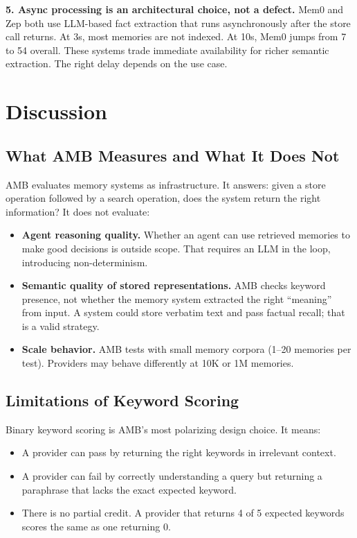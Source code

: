 \documentclass[11pt]{article}
\begin{document}
\textbf{5. Async processing is an architectural choice, not a defect.} Mem0 and Zep both use LLM-based fact extraction that runs asynchronously after the store call returns. At 3s, most memories are not indexed. At 10s, Mem0 jumps from 7 to 54 overall. These systems trade immediate availability for richer semantic extraction. The right delay depends on the use case.

\section{Discussion}

\subsection{What AMB Measures and What It Does Not}

AMB evaluates memory systems as infrastructure. It answers: given a store operation followed by a search operation, does the system return the right information? It does not evaluate:

\begin{itemize}
    \item \textbf{Agent reasoning quality.} Whether an agent can use retrieved memories to make good decisions is outside scope. That requires an LLM in the loop, introducing non-determinism.
    \item \textbf{Semantic quality of stored representations.} AMB checks keyword presence, not whether the memory system extracted the right ``meaning'' from input. A system could store verbatim text and pass factual recall; that is a valid strategy.
    \item \textbf{Scale behavior.} AMB tests with small memory corpora (1--20 memories per test). Providers may behave differently at 10K or 1M memories.
\end{itemize}

\subsection{Limitations of Keyword Scoring}

Binary keyword scoring is AMB's most polarizing design choice. It means:

\begin{itemize}
    \item A provider can pass by returning the right keywords in irrelevant context.
    \item A provider can fail by correctly understanding a query but returning a paraphrase that lacks the exact expected keyword.
    \item There is no partial credit. A provider that returns 4 of 5 expected keywords scores the same as one returning 0.
\end{itemize}
\end{document}
